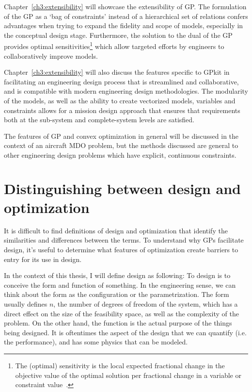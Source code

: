 Chapter~\ref{ch3:extensibility} will showcase the extensibility of \gls{GP}.
The formulation of the \gls{GP} as a `bag of constraints' instead of a
hierarchical set of relations confers advantages
when trying to expand the fidelity and scope of models, especially in the
conceptual design stage. Furthermore, the solution to the dual of the \gls{GP}
provides optimal sensitivities\footnote{The (optimal) sensitivity is the local expected
fractional change in the objective value of the optimal solution per
fractional change in a variable or constraint value~\cite{gpintro}.}
which allow targeted efforts by engineers to
collaboratively improve models.

Chapter~\ref{ch3:extensibility} will also discuss the features specific to
GPkit in facilitating
an engineering design process that is streamlined and collaborative, and is
compatible with modern engineering design methodologies. The modularity of the
models, as well as the ability to create vectorized models, variables and constraints
allows for a mission design approach that ensures that
requirements both at the sub-system and complete-system levels are satisfied.

The features of \gls{GP} and convex optimization in general will be discussed in
the context of an aircraft \gls{MDO} problem, but the methods discussed
are general to other engineering design problems which have explicit, continuous constraints.

\section{Distinguishing between design and optimization} \label{s:DesVsOpt}

It is difficult to find definitions of design and optimization that
identify the similarities and differences between the terms.
To understand why \gls{GP}s facilitate design, it's useful to determine what
features of optimization create barriers to entry for its use in design.

In the context of this thesis, I will define design as following:
To design is to conceive the form and function of something.
In the engineering sense, we can think about the form as the configuration or
the parametrization. The form usually defines $n$, the number of degrees of freedom
of the system, which has a direct effect on the size of the feasibility
space, as well as the complexity of the problem.
On the other hand, the function is the actual purpose of the things
being designed. It is oftentimes the aspect of the design that we can
quantify (i.e. the performance), and has some physics that can be modeled.

